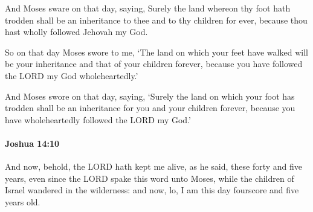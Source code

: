 			\begin{versebox}
					\item[BHS] 
					\item[ASV] And Moses sware on that day, saying, Surely the land whereon thy foot hath trodden shall be an inheritance to thee and to thy children for ever, because thou hast wholly followed Jehovah my God.
					\item[NIV] So on that day Moses swore to me, ‘The land on which your feet have walked will be your inheritance and that of your children forever, because you have followed the LORD my God wholeheartedly.’
					\item[NRSV] And Moses swore on that day, saying, ‘Surely the land on which your foot has trodden shall be an inheritance for you and your children forever, because you have wholeheartedly followed the LORD my God.’
			\end{versebox}

		\paragraph{Joshua 14:10} %
			\label{JOSHUA-14-10}

			And now, behold, the LORD hath kept me alive, as he said, these forty and five years, even since the LORD spake this word unto Moses, while the children of Israel wandered in the wilderness: and now, lo, I am this day fourscore and five years old.

